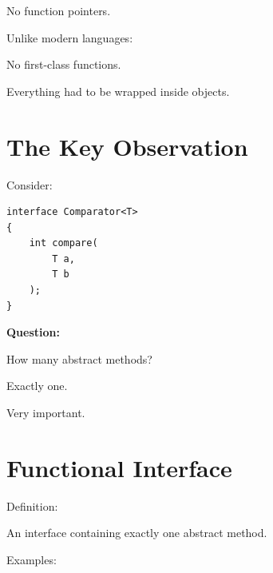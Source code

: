 \documentclass[11pt,a4paper]{book}
\begin{document}

No function pointers.


Unlike modern languages:


No first-class functions.


Everything had to be wrapped
inside objects.


\section{The Key Observation}

Consider:

\begin{verbatim} 
interface Comparator<T>
{
    int compare(
        T a,
        T b
    );
}
\end{verbatim}


\textbf{Question:}

How many abstract methods?


Exactly one.


Very important.


\section{Functional Interface}

Definition:


An interface containing
exactly one abstract method.


Examples:

\end{document}
